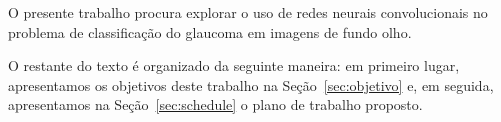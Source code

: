 \documentclass[12pt]{article}
\begin{document}

O presente trabalho procura explorar o uso de redes neurais convolucionais no problema de classificação do glaucoma em imagens de fundo olho.

O restante do texto é organizado da seguinte maneira: em primeiro lugar, apresentamos os objetivos deste trabalho na Seção~\ref{sec:objetivo} e, em seguida, apresentamos na Seção~\ref{sec:schedule} o plano de trabalho proposto.

\end{document}
